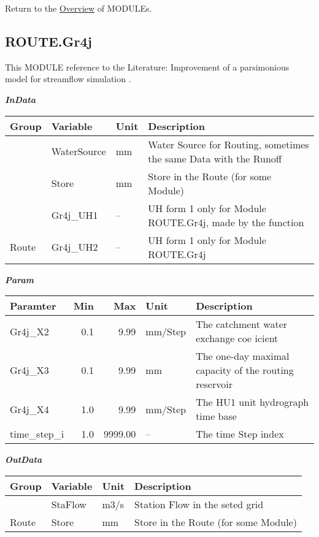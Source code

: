 \documentclass[
]{book}
\begin{document}
Return to the \protect\hyperlink{module}{Overview} of MODULEs.

\hypertarget{ROUTE.Gr4j}{%
\subsection{ROUTE.Gr4j}\label{ROUTE.Gr4j}}

This MODULE reference to the Literature: Improvement of a parsimonious model for streamflow simulation \citep{Perrin.2003}.

\textbf{\emph{InData}}

\begin{table}[!h]
\centering
\begin{tabular}{l|l|l|l}
\hline
Group & Variable & Unit & Description\\
\hline
 & WaterSource & mm & Water Source for Routing, sometimes the same Data with the Runoff\\
\cline{2-4}
 & Store & mm & Store in the Route (for some Module)\\
\cline{2-4}
 & Gr4j\_UH1 & -- & UH form 1 only for Module ROUTE.Gr4j, made by the function\\
\cline{2-4}
\multirow{-4}{*}{\raggedright\arraybackslash Route} & Gr4j\_UH2 & -- & UH form 1 only for Module ROUTE.Gr4j\\
\hline
\end{tabular}
\end{table}

\textbf{\emph{Param}}

\begin{table}[!h]
\centering
\begin{tabular}{l|r|r|l|l}
\hline
Paramter & Min & Max & Unit & Description\\
\hline
Gr4j\_X2 & 0.1 & 9.99 & mm/Step & The catchment water exchange coe icient\\
\cline{1-5}
Gr4j\_X3 & 0.1 & 9.99 & mm & The one-day maximal capacity of the routing reservoir\\
\cline{1-5}
Gr4j\_X4 & 1.0 & 9.99 & mm/Step & The HU1 unit hydrograph time base\\
\cline{1-5}
time\_step\_i & 1.0 & 9999.00 & -- & The time Step index\\
\hline
\end{tabular}
\end{table}

\textbf{\emph{OutData}}

\begin{table}[!h]
\centering
\begin{tabular}{l|l|l|l}
\hline
Group & Variable & Unit & Description\\
\hline
 & StaFlow & m3/s & Station Flow in the seted grid\\
\cline{2-4}
\multirow{-2}{*}{\raggedright\arraybackslash Route} & Store & mm & Store in the Route (for some Module)\\
\hline
\end{tabular}
\end{table}
\end{document}
